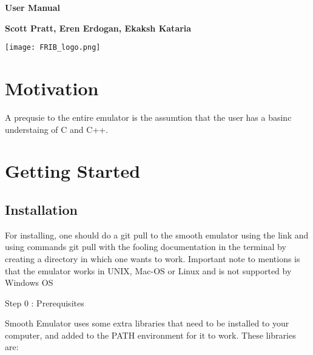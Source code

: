 \documentclass[12pt]{article}
\numberwithin{equation}{section}
\numberwithin{figure}{section}
\begin{document}
\begin{titlepage}
   \begin{center}
       \vspace*{1cm}

       \textbf{User Manual}

       \vspace{2.0cm}

       \textbf{Scott Pratt, Eren Erdogan, Ekaksh Kataria}
       
       \vfill
            
       \vspace{0.8cm}
     
       \texttt{[image: FRIB\_logo.png]}
            
            
   \end{center}
\end{titlepage}

\tableofcontents

\newpage


\section{Motivation}



 A prequsie to the entire emulator is the assumtion that the user has a basinc understaing of C and C++. 


\section{Getting Started}\label{sec:simplex}

\subsection{Installation}

For installing, one should do a git pull to the smooth emulator using the link and using commands git pull with the fooling documentation in the terminal by creating a directory in which one wants to work. Important note to mentions is that the emulator works in UNIX, Mac-OS or Linux and is not supported by Windows OS

\begin{description}
\item[Step 0 : Prerequisites] 
\end{description}

Smooth Emulator uses some extra libraries that need to be installed to your computer, and added to the PATH environment for it to work. These libraries are:
\end{document}
